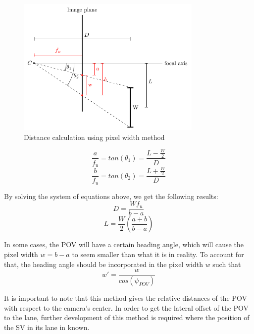 \begin{figure}[H]
    \centering
    \includegraphics[width = 0.8\textwidth]{Figures/DistanceCalc.pdf}
    \caption{Distance calculation using pixel width method}
\end{figure}

\begin{equation}
    \frac{a}{f_u} = tan\left( \theta_1 \right) =  \frac{L - \frac{W}{2}}{D} \label{eq:dista}
\end{equation}
\begin{equation}
    \frac{b}{f_u} = tan\left( \theta_2 \right) = \frac{L + \frac{W}{2}}{D} \label{eq:distb}
\end{equation}

By solving the system of equations above, we get the following results:
\begin{equation}
    D = \frac{W f_u}{b-a} \label{eqn:distD}
\end{equation}
\begin{equation}
    L = \frac{W}{2} \left( \frac{a+b}{b-a}\right) \label{eqn:distL}
\end{equation}

In some cases, the POV will have a certain heading angle, which will cause the pixel width $w = b-a$ to seem smaller than what it is in reality. To account for that, the heading angle should be incorporated in the pixel width $w$ such that
\begin{equation}
    w' = \frac{w}{cos(\psi_{POV})} \label{eqn:w_withheading}
\end{equation}

It is important to note that this method gives the relative distances of the POV with respect to the camera's center. In order to get the lateral offset of the POV to the lane, further development of this method is required where the position of the SV in its lane in known.

